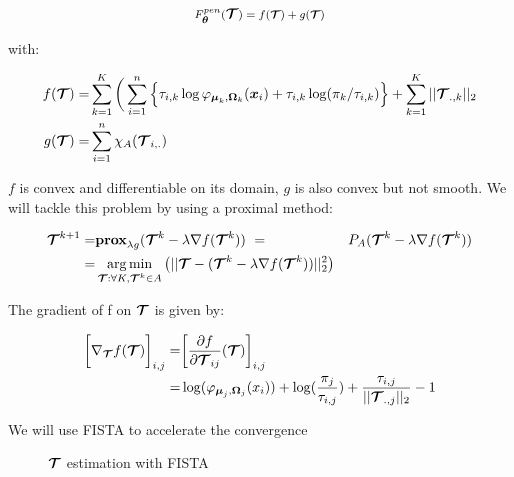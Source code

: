 \begin{equation}
F^{pen}_{{\boldsymbol\theta}}(\boldsymbol{\mathcal T})={\large f}({\footnotesize
\boldsymbol{\mathcal T}})+ {\large g}({\footnotesize
\boldsymbol{\mathcal T}})
\end{equation}

with:

\begin{align*}
f(\boldsymbol{\mathcal T}) =&   \sum_{k=1}^K \bigg(\sum_{i=1}^{n} \Big\{\tau_{i,k}\log\varphi_{\boldsymbol\mu_{k},\boldsymbol\Omega_{k}}(\boldsymbol x_i)+\tau_{i,k} \log(\pi_k/\tau_{i,k})\Big\} + \sum_{k=1}^K ||\boldsymbol{\mathcal T}_{.,k}||_{2}\\
g(\boldsymbol{\mathcal T}) =& \sum_{i=1}^{n} \chi_A(\boldsymbol{\mathcal T}_{i,.})
\end{align*}

$f$ is convex and differentiable on its domain, $g$ is also convex but not smooth. We will tackle this problem by using a proximal method:

\begin{align*}
  \boldsymbol{\mathcal T}^{k+1} =& {\bf{prox}}_{\lambda g}(\boldsymbol{\mathcal T}^k - \lambda \nabla f(\boldsymbol{\mathcal T}^k))\
      =& P_A(\boldsymbol{\mathcal T}^k - \lambda \nabla f(\boldsymbol{\mathcal T}^k))\\
      =&\operatorname*{arg\,min}_{ \boldsymbol{\mathcal T} : \forall K, \boldsymbol{\mathcal T}^k \in A}\big( || \boldsymbol{\mathcal T} - (\boldsymbol{\mathcal T}^k - \lambda \nabla f(\boldsymbol{\mathcal T}^k) ) ||^2_2 \big)
\end{align*}

The gradient of f on $\boldsymbol{\mathcal T}$ is given by:

\begin{align*}
\bigg[\nabla_{\boldsymbol{\mathcal T}}f(\boldsymbol{\mathcal T})\bigg]_{i,j} =& \bigg[\frac{\partial f}{\partial \boldsymbol{\mathcal T}_{ij}}(\boldsymbol{\mathcal T}) \bigg]_{i,j}\\
=& \log(\varphi_{\boldsymbol\mu_j,\boldsymbol\Omega_j}(x_i))+\log(\frac{\pi_j}{\tau_{i,j}})+\frac{\tau_{i,j}}{||\boldsymbol{\mathcal T}_{.,j}||_2}-1
\end{align*}

We will use FISTA to accelerate the convergence

\begin{figure}
\begin{center}
   \caption{ $\boldsymbol{\mathcal T}$ estimation with FISTA}
   \label{algo:PEM}
\end{center}
\end{figure}

